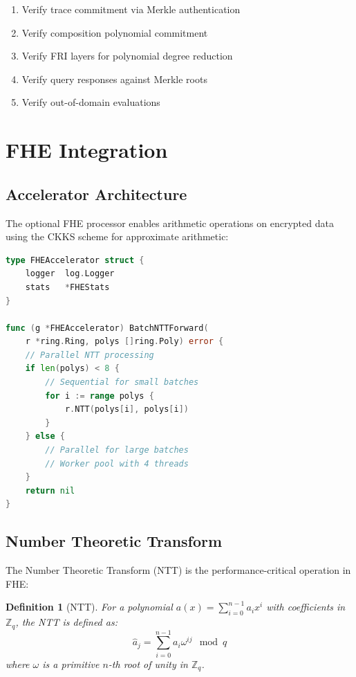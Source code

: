 \documentclass[11pt,a4paper]{article}
\newtheorem{definition}{Definition}
\begin{document}
\begin{enumerate}
    \item Verify trace commitment via Merkle authentication
    \item Verify composition polynomial commitment
    \item Verify FRI layers for polynomial degree reduction
    \item Verify query responses against Merkle roots
    \item Verify out-of-domain evaluations
\end{enumerate}

\section{FHE Integration}

\subsection{Accelerator Architecture}

The optional FHE processor enables arithmetic operations on encrypted data using the CKKS scheme for approximate arithmetic:

\begin{lstlisting}[language=Go,caption={FHE Accelerator Interface}]
type FHEAccelerator struct {
    logger  log.Logger
    stats   *FHEStats
}

func (g *FHEAccelerator) BatchNTTForward(
    r *ring.Ring, polys []ring.Poly) error {
    // Parallel NTT processing
    if len(polys) < 8 {
        // Sequential for small batches
        for i := range polys {
            r.NTT(polys[i], polys[i])
        }
    } else {
        // Parallel for large batches
        // Worker pool with 4 threads
    }
    return nil
}
\end{lstlisting}

\subsection{Number Theoretic Transform}

The Number Theoretic Transform (NTT) is the performance-critical operation in FHE:

\begin{definition}[NTT]
For a polynomial $a(x) = \sum_{i=0}^{n-1} a_i x^i$ with coefficients in $\mathbb{Z}_q$, the NTT is defined as:
\[
\hat{a}_j = \sum_{i=0}^{n-1} a_i \omega^{ij} \mod q
\]
where $\omega$ is a primitive $n$-th root of unity in $\mathbb{Z}_q$.
\end{definition}
\end{document}
